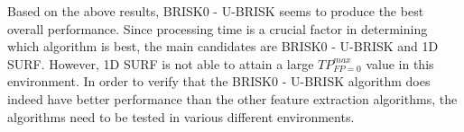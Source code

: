 \documentclass[11pt]{report}
\begin{document}
Based on the above results, BRISK0 - U-BRISK seems to produce the best overall performance. Since processing time is a crucial factor in determining which algorithm is best, the main candidates are BRISK0 - U-BRISK and 1D SURF. However, 1D SURF is not able to attain a large $TP_{FP=0}^{max}$ value in this environment. In order to verify that the BRISK0 - U-BRISK algorithm does indeed have better performance than the other feature extraction algorithms, the algorithms need to be tested in various different environments.\\ 


\end{document}
